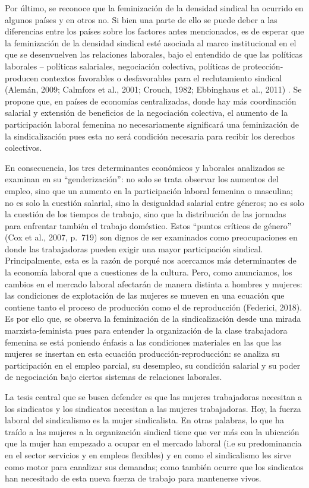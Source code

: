 \documentclass[
]{book}
\begin{document}
Por último, se reconoce que la feminización de la densidad sindical ha ocurrido en algunos países y en otros no. Si bien una parte de ello se puede deber a las diferencias entre los países sobre los factores antes mencionados, es de esperar que la feminización de la densidad sindical esté asociada al marco institucional en el que se desenvuelven las relaciones laborales, bajo el entendido de que las políticas laborales -- políticas salariales, negociación colectiva, políticas de protección- producen contextos favorables o desfavorables para el reclutamiento sindical (Alemán, 2009; Calmfors et al., 2001; Crouch, 1982; Ebbinghaus et al., 2011) . Se propone que, en países de economías centralizadas, donde hay más coordinación salarial y extensión de beneficios de la negociación colectiva, el aumento de la participación laboral femenina no necesariamente significará una feminización de la sindicalización pues esta no será condición necesaria para recibir los derechos colectivos.

En consecuencia, los tres determinantes económicos y laborales analizados se examinan en su ``genderización'': no solo se trata observar los aumentos del empleo, sino que un aumento en la participación laboral femenina o masculina; no es solo la cuestión salarial, sino la desigualdad salarial entre géneros; no es solo la cuestión de los tiempos de trabajo, sino que la distribución de las jornadas para enfrentar también el trabajo doméstico. Estos ``puntos críticos de género'' (Cox et al., 2007, p.~719) son dignos de ser examinados como preocupaciones en donde las trabajadoras pueden exigir una mayor participación sindical. Principalmente, esta es la razón de porqué nos acercamos más determinantes de la economía laboral que a cuestiones de la cultura. Pero, como anunciamos, los cambios en el mercado laboral afectarán de manera distinta a hombres y mujeres: las condiciones de explotación de las mujeres se mueven en una ecuación que contiene tanto el proceso de producción como el de reproducción (Federici, 2018). Es por ello que, se observa la feminización de la sindicalización desde una mirada marxista-feminista pues para entender la organización de la clase trabajadora femenina se está poniendo énfasis a las condiciones materiales en las que las mujeres se insertan en esta ecuación producción-reproducción: se analiza su participación en el empleo parcial, su desempleo, su condición salarial y su poder de negociación bajo ciertos sistemas de relaciones laborales.

La tesis central que se busca defender es que las mujeres trabajadoras necesitan a los sindicatos y los sindicatos necesitan a las mujeres trabajadoras. Hoy, la fuerza laboral del sindicalismo es la mujer sindicalista. En otras palabras, lo que ha traído a las mujeres a la organización sindical tiene que ver más con la ubicación que la mujer han empezado a ocupar en el mercado laboral (i.e su predominancia en el sector servicios y en empleos flexibles) y en como el sindicalismo les sirve como motor para canalizar sus demandas; como también ocurre que los sindicatos han necesitado de esta nueva fuerza de trabajo para mantenerse vivos.
\end{document}
